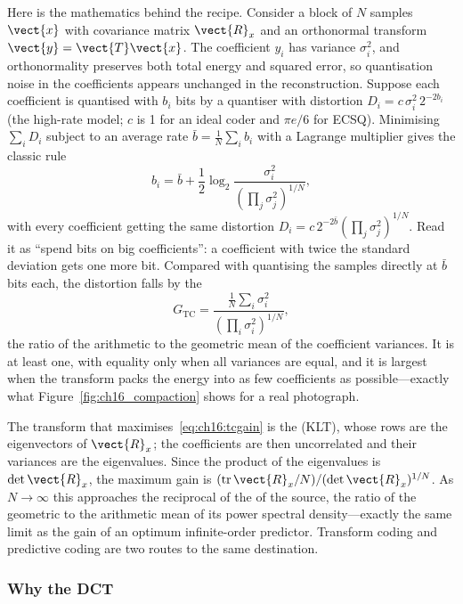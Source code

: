 Here is the mathematics behind the recipe. Consider a block of $N$ samples $\vect{x}$ with
covariance matrix $\vect{R}_x$ and an orthonormal transform $\vect{y}=\vect{T}\vect{x}$. The
coefficient $y_i$ has variance $\sigma_i^2$, and orthonormality preserves both total energy and
squared error, so quantisation noise in the coefficients appears unchanged in the reconstruction.
Suppose each coefficient is quantised with $b_i$ bits by a quantiser with distortion
$D_i=c\,\sigma_i^2\,2^{-2b_i}$ (the high-rate model; $c$ is 1 for an ideal coder and $\pi e/6$ for
ECSQ). Minimising $\sum_iD_i$ subject to an average rate $\bar b=\frac1N\sum_ib_i$ with a Lagrange
multiplier gives the classic  rule
\begin{equation}
b_i=\bar b+\frac12\log_2\frac{\sigma_i^2}{\left(\prod_j\sigma_j^2\right)^{1/N}},
\label{eq:ch16:bitalloc}
\end{equation}
with every coefficient getting the same distortion $D_i=c\,2^{-2\bar b}(\prod_j\sigma_j^2)^{1/N}$.
Read it as ``spend bits on big coefficients'': a coefficient with twice the standard deviation
gets one more bit. Compared with quantising the samples directly at $\bar b$ bits each, the
distortion falls by the 
\begin{equation}
G_{\text{TC}}=\frac{\frac1N\sum_i\sigma_i^2}{\left(\prod_i\sigma_i^2\right)^{1/N}},
\label{eq:ch16:tcgain}
\end{equation}
the ratio of the arithmetic to the geometric mean of the coefficient variances. It is at least one,
with equality only when all variances are equal, and it is largest when the transform packs the
energy into as few coefficients as possible---exactly what Figure~\ref{fig:ch16_compaction} shows
for a real photograph.

The transform that maximises~\eqref{eq:ch16:tcgain} is the 
(KLT), whose rows are the eigenvectors of $\vect{R}_x$; the coefficients are then uncorrelated and
their variances are the eigenvalues. Since the product of the eigenvalues is $\det\vect{R}_x$, the
maximum gain is $(\operatorname{tr}\vect{R}_x/N)/(\det\vect{R}_x)^{1/N}$. As $N\to\infty$ this
approaches the reciprocal of the  of the source, the ratio of the
geometric to the arithmetic mean of its power spectral density---exactly the same limit as the gain
of an optimum infinite-order predictor. Transform coding and predictive coding are two routes to the
same destination.

\subsubsection{Why the DCT}

